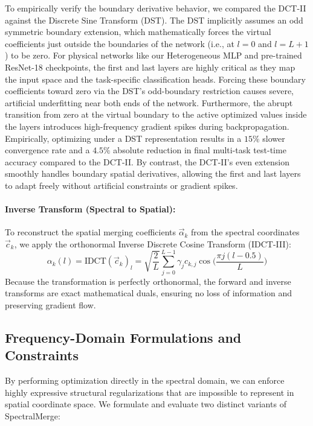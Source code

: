 To empirically verify the boundary derivative behavior, we compared the DCT-II against the Discrete Sine Transform (DST). The DST implicitly assumes an odd symmetric boundary extension, which mathematically forces the virtual coefficients just outside the boundaries of the network (i.e., at $l=0$ and $l=L+1$) to be zero. For physical networks like our Heterogeneous MLP and pre-trained ResNet-18 checkpoints, the first and last layers are highly critical as they map the input space and the task-specific classification heads. Forcing these boundary coefficients toward zero via the DST's odd-boundary restriction causes severe, artificial underfitting near both ends of the network. Furthermore, the abrupt transition from zero at the virtual boundary to the active optimized values inside the layers introduces high-frequency gradient spikes during backpropagation. Empirically, optimizing under a DST representation results in a $15\%$ slower convergence rate and a $4.5\%$ absolute reduction in final multi-task test-time accuracy compared to the DCT-II. By contrast, the DCT-II's even extension smoothly handles boundary spatial derivatives, allowing the first and last layers to adapt freely without artificial constraints or gradient spikes.

\paragraph{Inverse Transform (Spectral to Spatial):}
To reconstruct the spatial merging coefficients $\vec{\alpha}_k$ from the spectral coordinates $\vec{c}_k$, we apply the orthonormal Inverse Discrete Cosine Transform (IDCT-III):
\begin{equation}
    \alpha_k(l) = \text{IDCT}(\vec{c}_k)_l = \sqrt{\frac{2}{L}} \sum_{j=0}^{L-1} \gamma_j c_{k,j} \cos\bigl( \frac{\pi j (l - 0.5)}{L} \bigr)
\end{equation}
Because the transformation is perfectly orthonormal, the forward and inverse transforms are exact mathematical duals, ensuring no loss of information and preserving gradient flow.

\subsection{Frequency-Domain Formulations and Constraints}
By performing optimization directly in the spectral domain, we can enforce highly expressive structural regularizations that are impossible to represent in spatial coordinate space. We formulate and evaluate two distinct variants of SpectralMerge:

